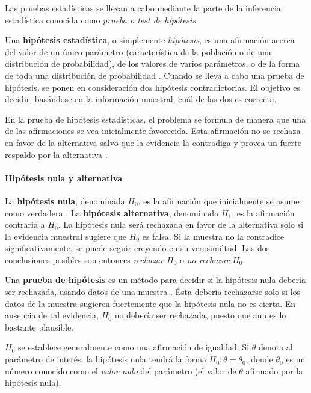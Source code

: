 Las pruebas estadísticas se llevan a cabo mediante la parte de la inferencia estadística conocida como \emph{prueba o test de hipótesis}.

Una \textbf{hipótesis estadística}, o simplemente \emph{hipótesis}, es una afirmación acerca del valor de un único parámetro (característica de la población o de una distribución de probabilidad), de los valores de varios parámetros, o de la forma de toda una distribución de probabilidad \cite{devore2015probability}. Cuando se lleva a cabo una prueba de hipótesis, se ponen en consideración dos hipótesis contradictorias. El objetivo es decidir, basándose en la información muestral, cuál de las dos es correcta.

En la prueba de hipótesis estadísticas, el problema se formula de manera que una de las afirmaciones se vea inicialmente favorecida. Esta afirmación no se rechaza en favor de la alternativa salvo que la evidencia la contradiga y provea un fuerte respaldo por la alternativa \cite{devore2015probability}.

\paragraph{Hipótesis nula y alternativa}
La \textbf{hipótesis nula}, denominada $H_{0}$, es la afirmación que inicialmente se asume como verdadera \cite{devore2015probability}. La \textbf{hipótesis alternativa}, denominada $H_{1}$, es la afirmación contraria a $H_{0}$. La hipótesis nula será rechazada en favor de la alternativa solo si la evidencia muestral sugiere que $H_{0}$ es falsa. Si la muestra no la contradice significativamente, se puede seguir creyendo en su verosimiltud. Las dos conclusiones posibles son entonces \emph{rechazar $H_{0}$} o \emph{no rechazar $H_{0}$}.

Una \textbf{prueba de hipótesis} es un método para decidir si la hipótesis nula debería ser rechazada, usando datos de una muestra \cite{devore2015probability}. Ésta debería rechazarse solo si los datos de la muestra sugieren fuertemente que la hipótesis nula no es cierta. En ausencia de tal evidencia, $H_{0}$ no debería ser rechazada, puesto que aun es lo bastante plausible.

$H_{0}$ se establece generalmente como una afirmación de igualdad. Si $\theta$ denota al parámetro de interés, la hipótesis nula tendrá la forma  $H_{0}: \theta = \theta_{0}$, donde  $\theta_{0}$ es un número conocido como el \emph{valor nulo}  del parámetro (el valor de $\theta$ afirmado por la hipótesis nula).

